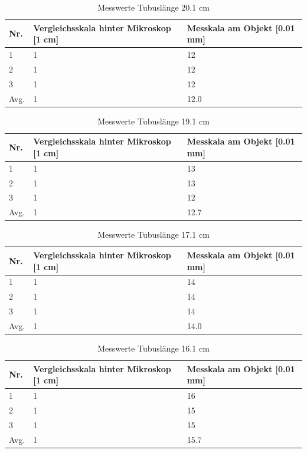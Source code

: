 \documentclass[12pt,a4paper,twoside]{article}
\begin{document}
\begin{table}[H]
    \centering
    \caption{Messwerte Tubuslänge 20.1 cm}
    \label{tab:messwerteTB20}
    \begin{tabular}{| l | l | l |}
        \hline
        Nr.   & Vergleichsskala hinter Mikroskop [1 cm]  & Messkala am Objekt [0.01 mm] \\
        \hline
        1 & 1 & 12 \\
        2 & 1 & 12 \\
        3 & 1 & 12 \\
        \hline
        Avg. & 1 & 12.0 \\
        \hline
    \end{tabular}
\end{table}

\begin{table}[H]
    \centering
    \caption{Messwerte Tubuslänge 19.1 cm}
    \label{tab:messwerteTB19}
    \begin{tabular}{| l | l | l |}
        \hline
        Nr.   & Vergleichsskala hinter Mikroskop [1 cm]  & Messkala am Objekt [0.01 mm] \\
        \hline
        1 & 1 & 13 \\
        2 & 1 & 13 \\
        3 & 1 & 12 \\
        \hline
        Avg. & 1 & 12.7 \\
        \hline
    \end{tabular}
\end{table}

\begin{table}[H]
    \centering
    \caption{Messwerte Tubuslänge 17.1 cm}
    \label{tab:messwerteTB17}
    \begin{tabular}{| l | l | l |}
        \hline
        Nr.   & Vergleichsskala hinter Mikroskop [1 cm]  & Messkala am Objekt [0.01 mm] \\
        \hline
        1 & 1 & 14 \\
        2 & 1 & 14 \\
        3 & 1 & 14 \\
        \hline
        Avg. & 1 & 14.0 \\
        \hline
    \end{tabular}
\end{table}

\begin{table}[H]
    \centering
    \caption{Messwerte Tubuslänge 16.1 cm}
    \label{tab:messwerteTB16}
    \begin{tabular}{| l | l | l |}
        \hline
        Nr.   & Vergleichsskala hinter Mikroskop [1 cm]  & Messkala am Objekt [0.01 mm] \\
        \hline
        1 & 1 & 16 \\
        2 & 1 & 15 \\
        3 & 1 & 15 \\
        \hline
        Avg. & 1 & 15.7 \\
        \hline
    \end{tabular}
\end{table}
\end{document}
